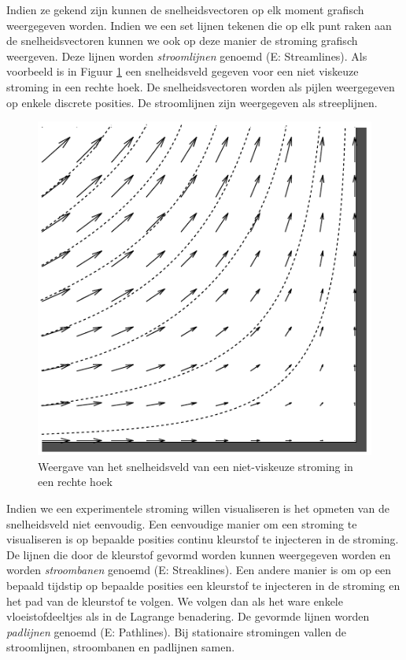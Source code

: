 Indien ze gekend zijn kunnen de snelheidsvectoren op elk moment grafisch weergegeven worden. Indien we een set lijnen tekenen die op elk punt raken aan de snelheidsvectoren kunnen we ook op deze manier de stroming grafisch weergeven. Deze lijnen worden \emph{stroomlijnen} genoemd (E: Streamlines). Als voorbeeld is in Figuur \ref{fig:snelheidsveld} een snelheidsveld gegeven voor een niet viskeuze stroming in een rechte hoek. De snelheidsvectoren worden als pijlen weergegeven op enkele discrete posities. De stroomlijnen zijn weergegeven als streeplijnen.
\begin{figure}[htb]
	\centering
	\includegraphics{fig/basisbegrippen/Snelheidsveld}
	\caption{Weergave van het snelheidsveld van een niet-viskeuze stroming in een rechte hoek}
	\label{fig:snelheidsveld}
\end{figure}
Indien we een experimentele stroming willen visualiseren is het opmeten van de snelheidsveld niet eenvoudig. Een eenvoudige manier om een stroming te visualiseren is op bepaalde posities continu kleurstof te injecteren in de stroming. De lijnen die door de kleurstof gevormd worden kunnen weergegeven worden en worden \emph{stroombanen} genoemd (E: Streaklines).
Een andere manier is om op een bepaald tijdstip op bepaalde posities een kleurstof te injecteren in de stroming en het pad van de kleurstof te volgen. We volgen dan als het ware enkele vloeistofdeeltjes als in de Lagrange benadering. De gevormde lijnen worden \emph{padlijnen} genoemd (E: Pathlines).
Bij stationaire stromingen vallen de stroomlijnen, stroombanen en padlijnen samen.

